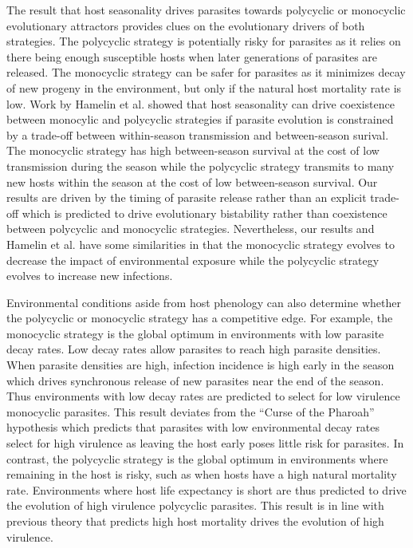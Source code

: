 \documentclass{article}
\begin{document}
The result that host seasonality drives parasites towards polycyclic or monocyclic evolutionary attractors provides clues on the evolutionary drivers of both strategies. The polycyclic strategy is potentially risky for parasites as it relies on there being enough susceptible hosts when later generations of parasites are released. The monocyclic strategy can be safer for parasites as it minimizes decay of new progeny in the environment, but only if the natural host mortality rate is low. Work by Hamelin et al. showed that host seasonality can drive coexistence between monocylic and polycyclic strategies if parasite evolution is constrained by a trade-off between within-season transmission and between-season surival\cite{hamelin2011seasonality}. The monocyclic strategy has high between-season survival at the cost of low transmission during the season while the polycyclic strategy transmits to many new hosts within the season at the cost of low between-season survival. Our results are driven by the timing of parasite release rather than an explicit trade-off which is predicted to drive evolutionary bistability rather than coexistence between polycyclic and  monocyclic strategies. Nevertheless, our results and Hamelin et al. have some similarities in that the monocyclic strategy evolves to decrease the impact of environmental exposure while the polycyclic strategy evolves to increase new infections.

Environmental conditions aside from host phenology can also determine whether the polycyclic or monocyclic strategy has a competitive edge. For example, the monocyclic strategy is the  global optimum in environments with low parasite decay rates. Low decay rates allow parasites to reach high parasite densities. When parasite densities are high, infection incidence is high early in the season which drives synchronous release of new parasites near the end of the season. Thus environments with low decay rates are predicted to select for low virulence monocyclic parasites. This result deviates from the ``Curse of the Pharoah'' hypothesis which predicts that parasites with low environmental decay rates select for high virulence as leaving the host early poses little risk for parasites\cite{}. In contrast, the polycyclic strategy is the global optimum in environments where remaining in the host is risky, such as when hosts have a high natural mortality rate. Environments where host life expectancy is short are thus predicted to drive the evolution of high virulence polycyclic parasites. This result is in line with previous theory that predicts high host mortality drives the evolution of high virulence\cite{Anderson1982,Lenski1994,Gandon2001,Cooper2002}.
\end{document}
